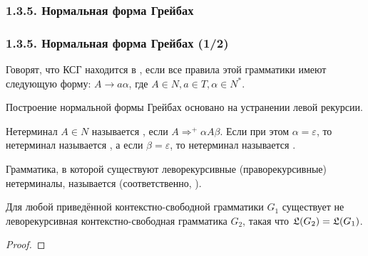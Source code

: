 \subsubsection{1.3.5. Нормальная форма Грейбах}\label{1.3.5.}
\begin{frame}
\frametitle{1.3.5. Нормальная форма Грейбах (1/2)}
%
%

Говорят, что КСГ находится в 
, если все правила этой грамматики
имеют следующую форму: 
$A\to a\alpha$, где $A \in N, a\in T, \alpha\in N^*$. 

Построение нормальной формы Грейбах 
основано на устранении левой рекурсии.

Нетерминал $A\in N$ называется 
,
если $A\Rightarrow^+\alpha A \beta$. 
Если при этом $\alpha =\varepsilon$, то
нетерминал называется 
,
а если $\beta =\varepsilon$, то
нетерминал называется 
.

\medskip
Грамматика, в которой существуют леворекурсивные
(праворекурсивные) нетерминалы,
называется 
 (соответственно, ).


\begin{theorem}
Для любой приведённой контекстно-свободной грамматики $G_1$
существует не леворекурсивная контекстно-свободная грамматика $G_2$,
такая что  $\frak{L}(G_2)=\frak{L}(G_1)$.
\end{theorem}

\begin{proof}
\end{proof}

\begin{example}
\end{example}

\end{frame}


